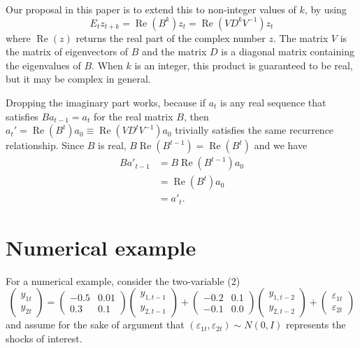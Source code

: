 \documentclass[12pt,fleqn]{article}
\renewcommand{\Re}{\operatorname{Re}}
\newcommand{\vep}{\varepsilon}
\begin{document}
Our proposal in this paper is to extend this to non-integer values of
$k$, by using
\[
E_t z_{t+k} = \Re(B^k) z_{t} = \Re(V D^k V^{-1}) z_t
\]
where $\Re(z)$ returns the real part of the complex number $z$. The
matrix $V$ is the matrix of eigenvectors of $B$ and the matrix $D$ is
a diagonal matrix containing the eigenvalues of $B$. When $k$ is an
integer, this product is guaranteed to be real, but it may be complex
in general.

Dropping the imaginary part works, because if $a_t$ is any real
sequence that satisfies $B a_{t-1} = a_t$ for the real matrix $B$,
then $a_t' = \Re(B^t) a_{0} \equiv \Re(V D^t V^{-1}) a_0$ trivially
satisfies the same recurrence relationship. Since $B$ is real, $B
\Re(B^{t-1}) = \Re(B^t)$ and we have
\begin{align*}
B a'_{t-1} &= B \Re(B^{t-1}) a_{0} \\
&= \Re(B^t) a_0 \\
&= a'_t.
\end{align*}

\section{Numerical example}

For a numerical example, consider the two-variable \VAR(2)
\begin{equation}
  \begin{pmatrix}
    y_{1t} \\ y_{2t}
  \end{pmatrix}
  =
  \begin{pmatrix}
    - 0.5 & 0.01 \\ 0.3 & 0.1
  \end{pmatrix}
  \begin{pmatrix}
    y_{1,t-1} \\ y_{2,t-1}
  \end{pmatrix}
  +
  \begin{pmatrix}
    -0.2 & 0.1 \\ -0.1 & 0.0
  \end{pmatrix}
  \begin{pmatrix}
    y_{1,t-2} \\ y_{2,t-2}
  \end{pmatrix}
  +
  \begin{pmatrix}
    \vep_{1t} \\ \vep_{2t}
  \end{pmatrix}
\end{equation}
and assume for the sake of argument that $(\vep_{1t},\vep_{2t}) \sim
N(0,I)$ represents the shocks of interest.
\end{document}

